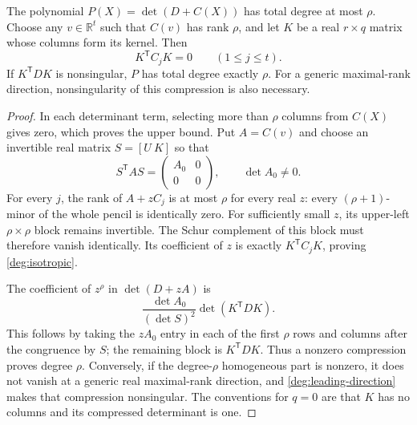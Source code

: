 \begin{lemma}
\label{deg:compression}
The polynomial $P(X)=\det(D+C(X))$ has total degree at most $\rho$.
Choose any $v\in\mathbb R^t$ such that $C(v)$ has rank $\rho$, and let
$K$ be a real $r\times q$ matrix whose columns form its kernel.
Then
\begin{equation}\label{deg:isotropic}
 K^{\mathsf T}C_jK=0\qquad(1\le j\le t).
\end{equation}
If $K^{\mathsf T}DK$ is nonsingular, $P$ has total degree exactly $\rho$.
For a generic maximal-rank direction, nonsingularity of this compression
is also necessary.
\end{lemma}
\begin{proof}
In each determinant term, selecting more than $\rho$ columns from
$C(X)$ gives zero, which proves the upper bound.  Put $A=C(v)$ and
choose an invertible real matrix $S=[U\ K]$ so that
\[
 S^{\mathsf T}AS=\begin{pmatrix} A_0&0\\0&0\end{pmatrix},
 \qquad \det A_0\ne0.
\]
For every $j$, the rank of $A+zC_j$ is at most $\rho$ for every real
$z$: every $(\rho+1)$-minor of the whole pencil is identically zero.
For sufficiently small $z$, its upper-left $\rho\times\rho$ block
remains invertible.  The Schur complement of this block must therefore
vanish identically.  Its coefficient of $z$ is exactly
$K^{\mathsf T}C_jK$, proving \eqref{deg:isotropic}.

The coefficient of $z^\rho$ in $\det(D+zA)$ is
\begin{equation}\label{deg:leading-direction}
 \frac{\det A_0}{(\det S)^2}\det(K^{\mathsf T}DK).
\end{equation}
This follows by taking the $zA_0$ entry in each of the first $\rho$
rows and columns after the congruence by $S$; the remaining block is
$K^{\mathsf T}DK$.  Thus a nonzero compression proves degree $\rho$.
Conversely, if the degree-$\rho$ homogeneous part is nonzero, it does
not vanish at a generic real maximal-rank direction, and
\eqref{deg:leading-direction} makes that compression nonsingular.
The conventions for $q=0$ are that $K$ has no columns and its
compressed determinant is one.
\end{proof}

